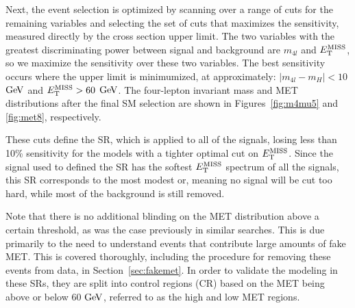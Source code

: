 
Next, the event selection is optimized by scanning over a range of cuts for the remaining variables and selecting the set of cuts that maximizes the sensitivity, measured directly by the cross section upper limit. The two variables with the greatest discriminating power between signal and background are $m_{4l}$ and $E_{\rm{T}}^{\rm{MISS}}$, so we maximize the sensitivity over these two variables. The best sensitivity occurs where the upper limit is minimumized, at approximately: $|m_{4l} - m_H| < 10$ $\mathrm{Ge\kern -0.1em V}$ and $E_{\rm{T}}^{\rm{MISS}} > 60$ $\mathrm{Ge\kern -0.1em V}$. The four-lepton invariant mass and MET distributions after the final SM selection are shown in Figures~\ref{fig:m4mu5} and \ref{fig:met8}, respectively. 


These cuts define the SR, which is applied to all of the signals, losing less than 10\% sensitivity for the models with a tighter optimal cut on $E_{\rm{T}}^{\rm{MISS}}$. Since the signal used to defined the SR has the softest $E_{\rm{T}}^{\rm{MISS}}$ spectrum of all the signals, this SR corresponds to the most modest or, meaning no signal will be cut too hard, while most of the background is still removed. 


Note that there is no additional blinding on the MET distribution above a certain threshold, as was the case previously in similar searches. This is due primarily to the need to understand events that contribute large amounts of fake MET. This is covered thoroughly, including the procedure for removing these events from data, in Section~\ref{sec:fakemet}. In order to validate the modeling in these SRs, they are split into control regions (CR) based on the MET being above or below 60 $\mathrm{Ge\kern -0.1em V}$, referred to as the high and low MET regions. 


